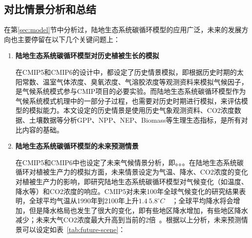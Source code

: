 \subsection{对比情景分析和总结}
在第\ref{sec:model}节中分析过，陆地生态系统碳循环模型的应用广泛，未来的发展方向也主要停留在以下几个关键问题上：
\begin{enumerate}[(1)]
\item \textbf{陆地生态系统碳循环模型对历史植被生长的模拟}

在CMIP5和CMIP6的设计中，都设定了历史情景模拟，即根据历史时期的太阳常数、温室气体浓度、臭氧浓度、气溶胶浓度等观测资料来模拟气候因子，是气候系统模式参与CMIP项目的必要实验。而陆地生态系统碳循环模型作为气候系统模式机理中的一部分子过程，也需要对历史时期进行模拟，来评估模型的模拟能力。本文设定的历史情景是使用历史气象观测资料、CO2浓度数据、土壤数据等分析GPP、NPP、NEP、Biomass等生理生态指标，是所有对比内容的基础。

\item \textbf{陆地生态系统碳循环模型的未来预测情景}

在CMIP5和CMIP6中也设定了未来气候情景分析，即。。。在陆地生态系统碳循环对植被生产力的模拟方面，未来情景设定为气温、降水、CO2浓度的变化对植被生产力的影响，即研究陆地生态系统碳循环模型对气候变化（如温度、降水等）和CO2浓度的响应。CMIP5对未来100年全球气候变化的研究结果表明，全球平均气温从1990年到2100年上升$1.4~5.8^{\circ}C$~\cite{王绍武1995未来}~\cite{秦大河2003气候变化的事实与影响及对策}；全球平均降水将会增加，但是降水格局也发生了很大的变化，即有些地区降水增加，有些地区降水减少；未来大气CO2浓度最大升高到当前的2倍~\cite{griggs2002climate}。根据以上分析，未来预测情景可以设定如表~\ref{tab:future-scene}：


\end{enumerate}
